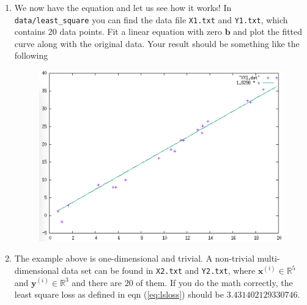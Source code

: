 \documentclass[a4paper,twoside, 10pt]{article}
\theoremstyle{wick}
\newcommand{\ttt}{\texttt}
\begin{document}
\begin{enumerate}
		\item We now have the equation and let us see how it works! In \ttt{data/least\_square} you can find the data file \ttt{X1.txt} and \ttt{Y1.txt}, which contains $20$ data points. Fit a linear equation with zero $\bm{b}$ and plot the fitted curve along with the original data. Your result should be something like the following
		\begin{figure}[H]
			\centering
			\includegraphics[width=0.6\linewidth]{plot/least_square/XY1.png}
		\end{figure}

		\item The example above is one-dimensional and trivial. A non-trivial multi-dimensional data set can be found in \ttt{X2.txt} and \ttt{Y2.txt}, where $\bm{x}^{(i)} \in \mathbb{R}^{5}$ and $\bm{y}^{(i)} \in \mathbb{R}^3$ and there are $20$ of them. If you do the math correctly, the least square loss as defined in eqn (\ref{eq:lsloss}) should be $3.431402129330746$.
	\end{enumerate}
\end{document}
